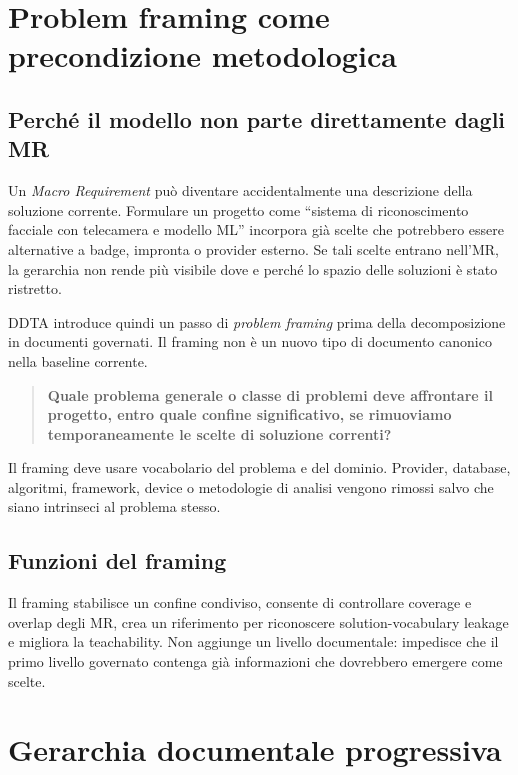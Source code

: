 \documentclass[12pt,a4paper,oneside]{report}
\newcommand{\mr}{\textit{Macro Requirement}}
\begin{document}
\section{Problem framing come precondizione metodologica}

\subsection{Perché il modello non parte direttamente dagli MR}

Un \mr{} può diventare accidentalmente una descrizione della soluzione corrente. Formulare un progetto come ``sistema di riconoscimento facciale con telecamera e modello ML'' incorpora già scelte che potrebbero essere alternative a badge, impronta o provider esterno. Se tali scelte entrano nell'MR, la gerarchia non rende più visibile dove e perché lo spazio delle soluzioni è stato ristretto.

DDTA introduce quindi un passo di \emph{problem framing} prima della decomposizione in documenti governati. Il framing non è un nuovo tipo di documento canonico nella baseline corrente.

\begin{quote}
\textbf{Quale problema generale o classe di problemi deve affrontare il progetto, entro quale confine significativo, se rimuoviamo temporaneamente le scelte di soluzione correnti?}
\end{quote}

Il framing deve usare vocabolario del problema e del dominio. Provider, database, algoritmi, framework, device o metodologie di analisi vengono rimossi salvo che siano intrinseci al problema stesso.

\subsection{Funzioni del framing}

Il framing stabilisce un confine condiviso, consente di controllare coverage e overlap degli MR, crea un riferimento per riconoscere solution-vocabulary leakage e migliora la teachability. Non aggiunge un livello documentale: impedisce che il primo livello governato contenga già informazioni che dovrebbero emergere come scelte.

\section{Gerarchia documentale progressiva}
\end{document}
